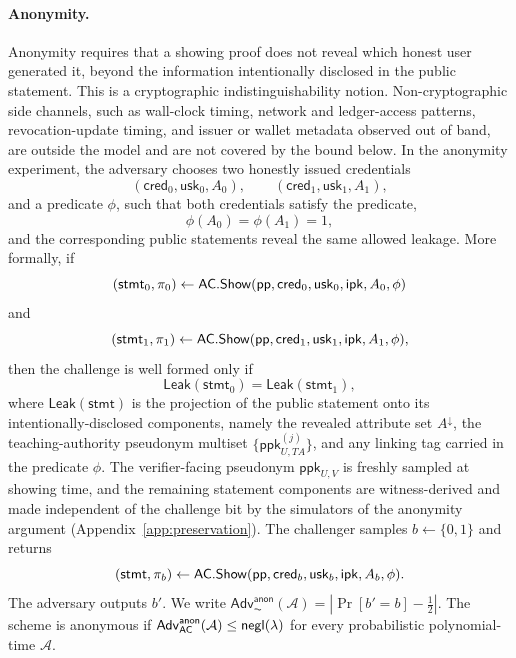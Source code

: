 \paragraph{Anonymity.}
Anonymity requires that a showing proof does not reveal which honest user generated it, beyond the information intentionally disclosed in the public statement. This is a cryptographic indistinguishability notion. Non-cryptographic side channels, such as wall-clock timing, network and ledger-access patterns, revocation-update timing, and issuer or wallet metadata observed out of band, are outside the model and are not covered by the bound below. In the anonymity experiment, the adversary chooses two honestly issued credentials
\begin{equation*}
  (\mathsf{cred}_0,\mathsf{usk}_0,A_0),
  \qquad
  (\mathsf{cred}_1,\mathsf{usk}_1,A_1),
\end{equation*}
and a predicate \(\phi\), such that both credentials satisfy the predicate,
\begin{equation*}
  \phi(A_0)=\phi(A_1)=1,
\end{equation*}
and the corresponding public statements reveal the same allowed leakage. More formally, if
\begin{equation*}
  (\mathsf{stmt}_0,\pi_0)
  \leftarrow
  \mathsf{AC}.\mathsf{Show}(\mathsf{pp},\mathsf{cred}_0,\mathsf{usk}_0,\mathsf{ipk},A_0,\phi)
\end{equation*}
and
\begin{equation*}
  (\mathsf{stmt}_1,\pi_1)
  \leftarrow
  \mathsf{AC}.\mathsf{Show}(\mathsf{pp},\mathsf{cred}_1,\mathsf{usk}_1,\mathsf{ipk},A_1,\phi),
\end{equation*}
then the challenge is well formed only if
\begin{equation*}
  \mathsf{Leak}(\mathsf{stmt}_0)=\mathsf{Leak}(\mathsf{stmt}_1),
\end{equation*}
where \(\mathsf{Leak}(\mathsf{stmt})\) is the projection of the public statement onto its intentionally-disclosed components, namely the revealed attribute set \(A^\downarrow\), the teaching-authority pseudonym multiset \(\{\mathsf{ppk}_{U,TA}^{(j)}\}\), and any linking tag carried in the predicate \(\phi\). The verifier-facing pseudonym \(\mathsf{ppk}_{U,V}\) is freshly sampled at showing time, and the remaining statement components are witness-derived and made independent of the challenge bit by the simulators of the anonymity argument (Appendix~\ref{app:preservation}). The challenger samples \(b\leftarrow\{0,1\}\) and returns
\begin{equation*}
  (\mathsf{stmt},\pi_b)
  \leftarrow
  \mathsf{AC}.\mathsf{Show}(\mathsf{pp},\mathsf{cred}_b,\mathsf{usk}_b,\mathsf{ipk},A_b,\phi).
\end{equation*}
The adversary outputs \(b'\). We write \(\mathsf{Adv}^{\mathsf{anon}}_{\AC}(\mathcal A)=\left|\Pr[b'=b]-\tfrac12\right|\). The scheme is anonymous if \(\mathsf{Adv}^{\mathsf{anon}}_{\mathsf{AC}}(\mathcal A)\le\mathsf{negl}(\lambda)\) for every probabilistic polynomial-time \(\mathcal A\).

